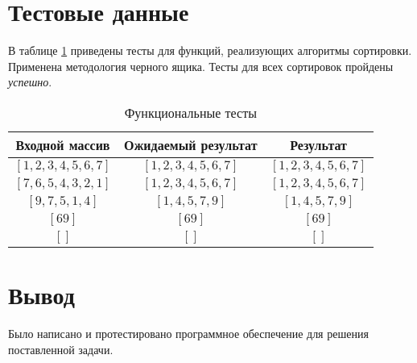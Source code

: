 \section{Тестовые данные}

В таблице \ref{tbl:functional_test} приведены тесты для функций, реализующих алгоритмы сортировки. Применена методология черного ящика. Тесты для всех сортировок пройдены \textit{успешно}.



\begin{table}[ht!]
	\begin{center}
		\captionsetup{justification=raggedleft,singlelinecheck=off}
		\caption{\label{tbl:functional_test} Функциональные тесты}
		\begin{tabular}{|c|c|c|}
			\hline
			Входной массив & Ожидаемый результат & Результат \\ 
			\hline
			$[1, 2, 3, 4, 5, 6, 7]$ & $[1, 2, 3, 4, 5, 6, 7]$  & $[1, 2, 3, 4, 5, 6, 7]$\\
			$[7, 6, 5, 4, 3, 2, 1]$  & $[1, 2, 3, 4, 5, 6, 7]$ & $[1, 2, 3, 4, 5, 6, 7]$\\
			$[9, 7, 5, 1, 4]$  & $[1, 4, 5, 7, 9]$  & $[1, 4, 5, 7, 9]$\\
			$[69]$  & $[69]$  & $[69]$\\
			$[]$  & $[]$  & $[]$\\
			\hline
		\end{tabular}
	\end{center}
\end{table}

\section*{Вывод}
Было написано и протестировано программное обеспечение для решения поставленной задачи.